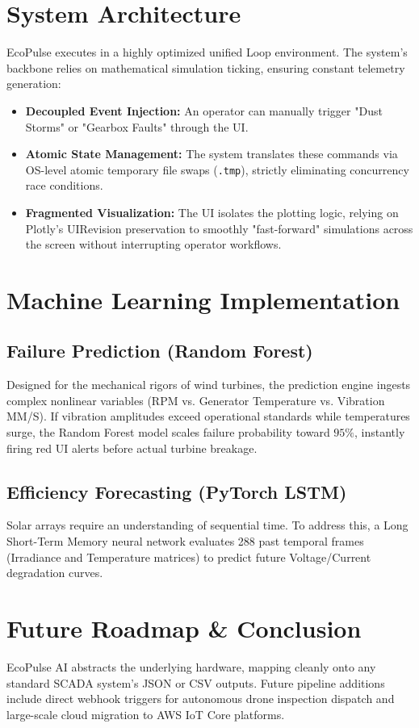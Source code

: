 \documentclass[12pt, a4paper]{article}
\begin{document}
\section{System Architecture}
EcoPulse executes in a highly optimized unified Loop environment. The system's backbone relies on mathematical simulation ticking, ensuring constant telemetry generation:
\begin{itemize}
    \item \textbf{Decoupled Event Injection:} An operator can manually trigger "Dust Storms" or "Gearbox Faults" through the UI.
    \item \textbf{Atomic State Management:} The system translates these commands via OS-level atomic temporary file swaps (\texttt{.tmp}), strictly eliminating concurrency race conditions.
    \item \textbf{Fragmented Visualization:} The UI isolates the plotting logic, relying on Plotly's UIRevision preservation to smoothly "fast-forward" simulations across the screen without interrupting operator workflows.
\end{itemize}

\section{Machine Learning Implementation}
\subsection{Failure Prediction (Random Forest)}
Designed for the mechanical rigors of wind turbines, the prediction engine ingests complex nonlinear variables (RPM vs. Generator Temperature vs. Vibration MM/S). If vibration amplitudes exceed operational standards while temperatures surge, the Random Forest model scales failure probability toward $95\%$, instantly firing red UI alerts before actual turbine breakage.

\subsection{Efficiency Forecasting (PyTorch LSTM)}
Solar arrays require an understanding of sequential time. To address this, a Long Short-Term Memory neural network evaluates 288 past temporal frames (Irradiance and Temperature matrices) to predict future Voltage/Current degradation curves. 

\section{Future Roadmap \& Conclusion}
EcoPulse AI abstracts the underlying hardware, mapping cleanly onto any standard SCADA system's JSON or CSV outputs. Future pipeline additions include direct webhook triggers for autonomous drone inspection dispatch and large-scale cloud migration to AWS IoT Core platforms.
\end{document}
